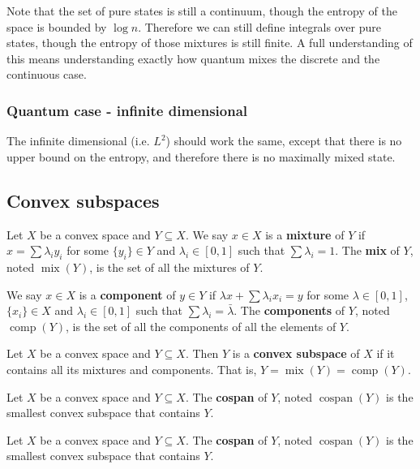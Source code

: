 \documentclass[11pt]{article}
\DeclareMathOperator{\mix}{mix}
\DeclareMathOperator{\component}{comp}
\DeclareMathOperator{\cospan}{cospan}
\begin{document}
Note that the set of pure states is still a continuum, though the entropy of the space is bounded by $\log n$. Therefore we can still define integrals over pure states, though the entropy of those mixtures is still finite. A full understanding of this means understanding exactly how quantum mixes the discrete and the continuous case.

\subsubsection{Quantum case - infinite dimensional}

The infinite dimensional (i.e. $L^2$) should work the same, except that there is no upper bound on the entropy, and therefore there is no maximally mixed state.




\subsection{Convex subspaces}


\begin{defn}
	Let $X$ be a convex space and $Y \subseteq X$. We say $x \in X$ is a \textbf{mixture} of $Y$ if $x = \sum \lambda_i y_i$ for some $\{y_i\} \in Y$ and $\lambda_i \in [0,1]$ such that $\sum \lambda_i = 1$. The \textbf{mix} of $Y$, noted $\mix(Y)$, is the set of all the mixtures of $Y$.
	
	We say $x \in X$ is a \textbf{component} of $y \in Y$ if $\lambda x + \sum \lambda_i x_i = y$ for some $\lambda \in [0,1]$, $\{x_i\} \in X$ and $\lambda_i \in [0,1]$ such that $\sum \lambda_i = \bar{\lambda}$. The \textbf{components} of $Y$, noted $\component(Y)$, is the set of all the components of all the elements of $Y$.
\end{defn}

\begin{defn}
	Let $X$ be a convex space and $Y \subseteq X$. Then $Y$ is a \textbf{convex subspace} of $X$ if it contains all its mixtures and components. That is, $Y = \mix(Y) = \component(Y)$.
\end{defn}

\begin{defn}
	Let $X$ be a convex space and $Y \subseteq X$. The \textbf{cospan} of $Y$, noted $\cospan(Y)$ is the smallest convex subspace that contains $Y$.
\end{defn}

\begin{defn}
	Let $X$ be a convex space and $Y \subseteq X$. The \textbf{cospan} of $Y$, noted $\cospan(Y)$ is the smallest convex subspace that contains $Y$.
\end{defn}
\end{document}
